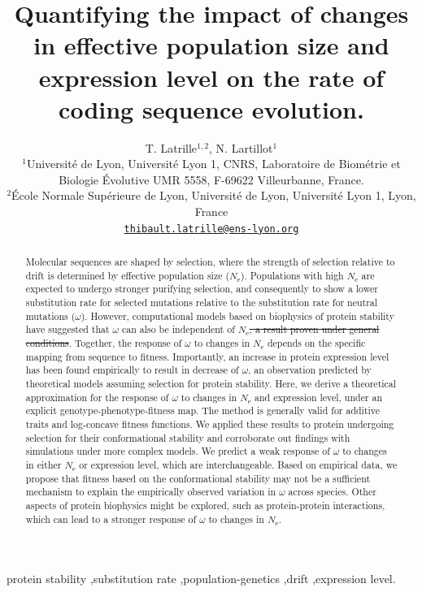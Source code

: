 \documentclass[authoryear]{elsarticle} %
\title{Quantifying the impact of changes in effective population size and expression level on the rate of coding sequence evolution.}
\author{
    \large
    T. {Latrille}$^{1,2}$, N. {Lartillot}$^{1}$ \\
    \normalsize
	$^{1}$Université de Lyon, Université Lyon 1, CNRS, Laboratoire de Biométrie et Biologie Évolutive UMR 5558, F-69622 Villeurbanne, France.\\
	$^{2}$École Normale Supérieure de Lyon, Université de Lyon, Université Lyon 1, Lyon, France\\
	\texttt{\href{mailto:thibault.latrille@ens-lyon.org}{thibault.latrille@ens-lyon.org}} \\
}
\newcommand{\Ne}{N_{\text{e}}} %
\providecommand{\DIFdeltex}[1]{{\protect\color{red}\sout{#1}}}                      %
\providecommand{\DIFdelbegin}{} %
\providecommand{\DIFdelend}{} %
\providecommand{\DIFdel}[1]{\texorpdfstring{\DIFdeltex{#1}}{}} %
\begin{document}
\begin{frontmatter}

\begin{abstract}
Molecular sequences are shaped by selection, where the strength of selection relative to drift is determined by effective population size ($\Ne$).
Populations with high $\Ne$ are expected to undergo stronger purifying selection, and consequently to show a lower substitution rate for selected mutations relative to the substitution rate for neutral mutations ($\omega$).
However, computational models based on biophysics of protein stability have suggested that $\omega$ can also be independent of $\Ne$\DIFdelbegin \DIFdel{, a result proven under general conditions}\DIFdelend .
Together, the response of $\omega$ to changes in $\Ne$ depends on the specific mapping from sequence to fitness.
Importantly, an increase in protein expression level has been found empirically to result in decrease of $\omega$, an observation predicted by theoretical models assuming selection for protein stability.
Here, we derive a theoretical approximation for the response of $\omega$ to changes in $\Ne$ and expression level, under an explicit genotype-phenotype-fitness map.
The method is generally valid for additive traits and log-concave fitness functions.
We applied these results to protein undergoing selection for their conformational stability and corroborate out findings with simulations under more complex models.
We predict a weak response of $\omega$ to changes in either $\Ne$ or expression level, which are interchangeable.
Based on empirical data, we propose that fitness based on the conformational stability may not be a sufficient mechanism to explain the empirically observed variation in $\omega$ across species.
Other aspects of protein biophysics might be explored, such as protein-protein interactions, which can lead to a stronger response of $\omega$ to changes in $\Ne$.
\end{abstract}

\begin{keyword}
	protein stability \sep substitution rate \sep population-genetics \sep drift \sep expression level.
\end{keyword}

\end{frontmatter}

\linenumbers
\end{document}

